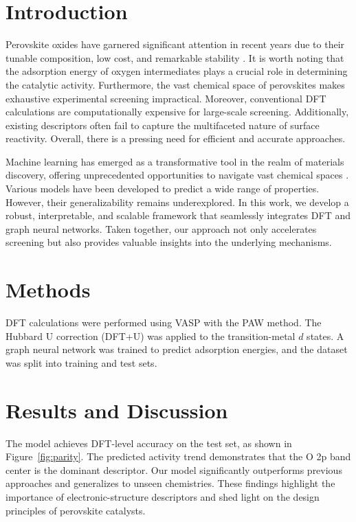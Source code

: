 \documentclass{article}
\begin{document}
\begin{abstract}
In the rapidly evolving landscape of materials science, the discovery of efficient oxygen evolution catalysts plays a pivotal role in sustainable energy conversion. In this work, we delve into the intricate interplay between electronic structure and catalytic activity of perovskite oxides by leveraging density functional theory (DFT) calculations and machine learning. Our comprehensive framework achieves remarkable accuracy, underscoring its potential to revolutionize catalyst design. Notably, the model reveals that the O 2p band center serves as a key descriptor, paving the way for the rational design of next-generation catalysts.
\end{abstract}

\section{Introduction}
Perovskite oxides have garnered significant attention in recent years due to their tunable composition, low cost, and remarkable stability \cite{suntivich2011}. It is worth noting that the adsorption energy of oxygen intermediates plays a crucial role in determining the catalytic activity. Furthermore, the vast chemical space of perovskites makes exhaustive experimental screening impractical. Moreover, conventional DFT calculations are computationally expensive for large-scale screening. Additionally, existing descriptors often fail to capture the multifaceted nature of surface reactivity. Overall, there is a pressing need for efficient and accurate approaches.

Machine learning has emerged as a transformative tool in the realm of materials discovery, offering unprecedented opportunities to navigate vast chemical spaces \cite{butler2018}. Various models have been developed to predict a wide range of properties. However, their generalizability remains underexplored. In this work, we develop a robust, interpretable, and scalable framework that seamlessly integrates DFT and graph neural networks. Taken together, our approach not only accelerates screening but also provides valuable insights into the underlying mechanisms.

\section{Methods}
DFT calculations were performed using VASP with the PAW method. The Hubbard U correction (DFT+U) was applied to the transition-metal $d$ states. A graph neural network was trained to predict adsorption energies, and the dataset was split into training and test sets.

\section{Results and Discussion}
The model achieves DFT-level accuracy on the test set, as shown in Figure~\ref{fig:parity}. The predicted activity trend demonstrates that the O 2p band center is the dominant descriptor. Our model significantly outperforms previous approaches and generalizes to unseen chemistries. These findings highlight the importance of electronic-structure descriptors and shed light on the design principles of perovskite catalysts.
\end{document}
